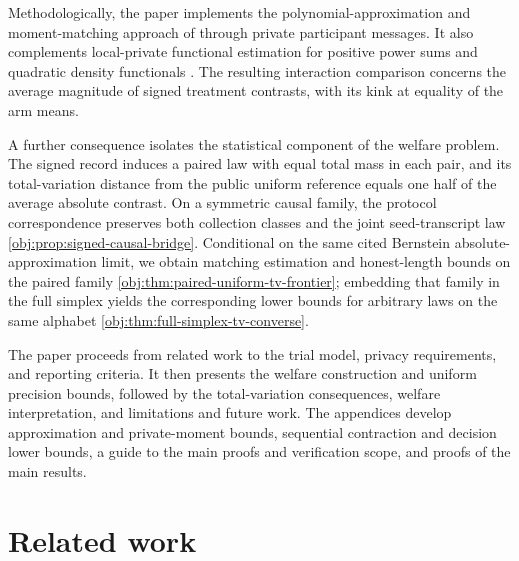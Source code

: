 \documentclass[11pt]{article}
\begin{document}
Methodologically, the paper implements the polynomial-approximation and moment-matching approach of \citet[Theorem~1 and Sections~3--5]{CaiLow2011Nonsmooth} through private participant messages. It also complements local-private functional estimation for positive power sums \citep[Theorems~2.4--2.7]{ButuceaIssartel2021Functionals} and quadratic density functionals \citep[Theorems~3.2--3.3 and~4.1--4.2]{ButuceaRohdeSteinberger2023Quadratic}. The resulting interaction comparison concerns the average magnitude of signed treatment contrasts, with its kink at equality of the arm means.

A further consequence isolates the statistical component of the welfare problem. The signed record induces a paired law with equal total mass in each pair, and its total-variation distance from the public uniform reference equals one half of the average absolute contrast. On a symmetric causal family, the protocol correspondence preserves both collection classes and the joint seed-transcript law \cref{obj:prop:signed-causal-bridge}. Conditional on the same cited Bernstein absolute-approximation limit, we obtain matching estimation and honest-length bounds on the paired family \cref{obj:thm:paired-uniform-tv-frontier}; embedding that family in the full simplex yields the corresponding lower bounds for arbitrary laws on the same alphabet \cref{obj:thm:full-simplex-tv-converse}.



The paper proceeds from related work to the trial model, privacy requirements, and reporting criteria. It then presents the welfare construction and uniform precision bounds, followed by the total-variation consequences, welfare interpretation, and limitations and future work. The appendices develop approximation and private-moment bounds, sequential contraction and decision lower bounds, a guide to the main proofs and verification scope, and proofs of the main results.

\section{Related work}
\end{document}
